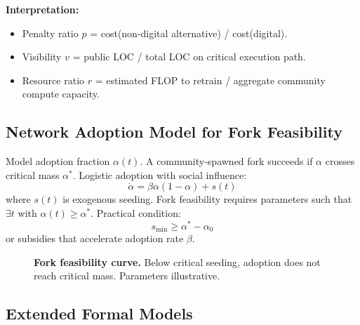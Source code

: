 \documentclass{article}
\begin{document}
\textbf{Interpretation:}
\begin{itemize}
    \item Penalty ratio $p$ = cost(non-digital alternative) / cost(digital).
    \item Visibility $v$ = public LOC / total LOC on critical execution path.
    \item Resource ratio $r$ = estimated FLOP to retrain / aggregate community compute capacity.
\end{itemize}

\subsection{Network Adoption Model for Fork Feasibility}

Model adoption fraction $\alpha(t)$. A community-spawned fork succeeds if $\alpha$ crosses critical mass $\alpha^*$. Logistic adoption with social influence:
\begin{equation}
\dot{\alpha} = \beta \alpha(1 - \alpha) + s(t)
\end{equation}
where $s(t)$ is exogenous seeding. Fork feasibility requires parameters such that $\exists t$ with $\alpha(t) \geq \alpha^*$. Practical condition:
\begin{equation}
s_{\min} \geq \alpha^* - \alpha_0
\end{equation}
or subsidies that accelerate adoption rate $\beta$.

\begin{figure}[htbp]
\centering
{}
\caption{\textbf{Fork feasibility curve.} Below critical seeding, adoption does not reach critical mass. Parameters illustrative.}
\label{fig:fork-feasibility}
\end{figure}

\subsection{Extended Formal Models}
\end{document}
